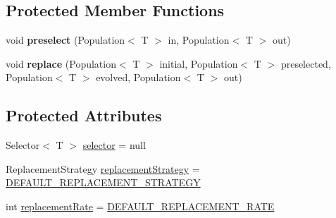 \subsection*{Protected Member Functions}
\begin{DoxyCompactItemize}
\item 
\hypertarget{classjenes_1_1stage_1_1operator_1_1common_1_1_steady_state_3_01_t_01extends_01_chromosome_01_4_a4cc6031dfce1f23a49dfb6270be45358}{void {\bfseries preselect} (Population$<$ T $>$ in, Population$<$ T $>$ out)}\label{classjenes_1_1stage_1_1operator_1_1common_1_1_steady_state_3_01_t_01extends_01_chromosome_01_4_a4cc6031dfce1f23a49dfb6270be45358}

\item 
\hypertarget{classjenes_1_1stage_1_1operator_1_1common_1_1_steady_state_3_01_t_01extends_01_chromosome_01_4_aedd46a5fd49b71554354612f991c1482}{void {\bfseries replace} (Population$<$ T $>$ initial, Population$<$ T $>$ preselected, Population$<$ T $>$ evolved, Population$<$ T $>$ out)}\label{classjenes_1_1stage_1_1operator_1_1common_1_1_steady_state_3_01_t_01extends_01_chromosome_01_4_aedd46a5fd49b71554354612f991c1482}

\end{DoxyCompactItemize}
\subsection*{Protected Attributes}
\begin{DoxyCompactItemize}
\item 
Selector$<$ T $>$ \hyperlink{classjenes_1_1stage_1_1operator_1_1common_1_1_steady_state_3_01_t_01extends_01_chromosome_01_4_a83a734a69acdc4ee13d42982a43e8ba1}{selector} = null
\item 
Replacement\-Strategy \hyperlink{classjenes_1_1stage_1_1operator_1_1common_1_1_steady_state_3_01_t_01extends_01_chromosome_01_4_a4d727adbb35eaad5d78fc59abaabea0c}{replacement\-Strategy} = \hyperlink{classjenes_1_1stage_1_1operator_1_1common_1_1_steady_state_3_01_t_01extends_01_chromosome_01_4_a4ed786deaaaefebd47fffc18e99b3710}{D\-E\-F\-A\-U\-L\-T\-\_\-\-R\-E\-P\-L\-A\-C\-E\-M\-E\-N\-T\-\_\-\-S\-T\-R\-A\-T\-E\-G\-Y}
\item 
int \hyperlink{classjenes_1_1stage_1_1operator_1_1common_1_1_steady_state_3_01_t_01extends_01_chromosome_01_4_a84dd70ced0dad9433e4168f18eb735f9}{replacement\-Rate} = \hyperlink{classjenes_1_1stage_1_1operator_1_1common_1_1_steady_state_3_01_t_01extends_01_chromosome_01_4_a9700692d577e24267d1105f2a6e3d379}{D\-E\-F\-A\-U\-L\-T\-\_\-\-R\-E\-P\-L\-A\-C\-E\-M\-E\-N\-T\-\_\-\-R\-A\-T\-E}
\end{DoxyCompactItemize}


